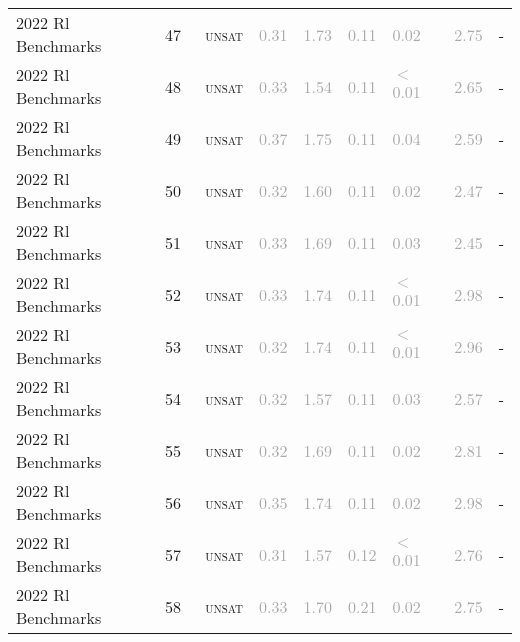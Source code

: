 \begin{center}
{\begin{longtable}{@{}lllllllll@{}}
2022 Rl Benchmarks & 47 & ~\textsc{unsat} & \textcolor{darkgray}{0.31} & \textcolor{darkgray}{1.73} & \textcolor{darkgray}{0.11} & \textcolor{darkgray}{0.02} & \textcolor{darkgray}{2.75} & - \\
2022 Rl Benchmarks & 48 & ~\textsc{unsat} & \textcolor{darkgray}{0.33} & \textcolor{darkgray}{1.54} & \textcolor{darkgray}{0.11} & \textcolor{darkgray}{$<$0.01} & \textcolor{darkgray}{2.65} & - \\
2022 Rl Benchmarks & 49 & ~\textsc{unsat} & \textcolor{darkgray}{0.37} & \textcolor{darkgray}{1.75} & \textcolor{darkgray}{0.11} & \textcolor{darkgray}{0.04} & \textcolor{darkgray}{2.59} & - \\
2022 Rl Benchmarks & 50 & ~\textsc{unsat} & \textcolor{darkgray}{0.32} & \textcolor{darkgray}{1.60} & \textcolor{darkgray}{0.11} & \textcolor{darkgray}{0.02} & \textcolor{darkgray}{2.47} & - \\
2022 Rl Benchmarks & 51 & ~\textsc{unsat} & \textcolor{darkgray}{0.33} & \textcolor{darkgray}{1.69} & \textcolor{darkgray}{0.11} & \textcolor{darkgray}{0.03} & \textcolor{darkgray}{2.45} & - \\
2022 Rl Benchmarks & 52 & ~\textsc{unsat} & \textcolor{darkgray}{0.33} & \textcolor{darkgray}{1.74} & \textcolor{darkgray}{0.11} & \textcolor{darkgray}{$<$0.01} & \textcolor{darkgray}{2.98} & - \\
2022 Rl Benchmarks & 53 & ~\textsc{unsat} & \textcolor{darkgray}{0.32} & \textcolor{darkgray}{1.74} & \textcolor{darkgray}{0.11} & \textcolor{darkgray}{$<$0.01} & \textcolor{darkgray}{2.96} & - \\
2022 Rl Benchmarks & 54 & ~\textsc{unsat} & \textcolor{darkgray}{0.32} & \textcolor{darkgray}{1.57} & \textcolor{darkgray}{0.11} & \textcolor{darkgray}{0.03} & \textcolor{darkgray}{2.57} & - \\
2022 Rl Benchmarks & 55 & ~\textsc{unsat} & \textcolor{darkgray}{0.32} & \textcolor{darkgray}{1.69} & \textcolor{darkgray}{0.11} & \textcolor{darkgray}{0.02} & \textcolor{darkgray}{2.81} & - \\
2022 Rl Benchmarks & 56 & ~\textsc{unsat} & \textcolor{darkgray}{0.35} & \textcolor{darkgray}{1.74} & \textcolor{darkgray}{0.11} & \textcolor{darkgray}{0.02} & \textcolor{darkgray}{2.98} & - \\
2022 Rl Benchmarks & 57 & ~\textsc{unsat} & \textcolor{darkgray}{0.31} & \textcolor{darkgray}{1.57} & \textcolor{darkgray}{0.12} & \textcolor{darkgray}{$<$0.01} & \textcolor{darkgray}{2.76} & - \\
2022 Rl Benchmarks & 58 & ~\textsc{unsat} & \textcolor{darkgray}{0.33} & \textcolor{darkgray}{1.70} & \textcolor{darkgray}{0.21} & \textcolor{darkgray}{0.02} & \textcolor{darkgray}{2.75} & - \\

\end{longtable}}
\end{center}
